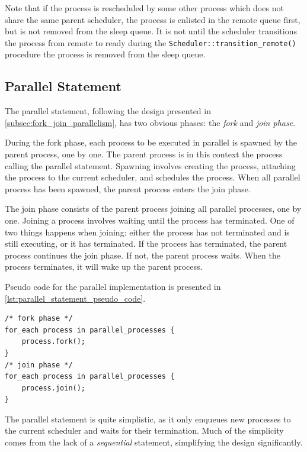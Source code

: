 Note that if the process is rescheduled by some other process which does not share the same parent scheduler, the process is enlisted in the remote queue first, but is not removed from the sleep queue. It is not until the scheduler transitions the process from remote to ready during the \texttt{Scheduler::transition\_remote()} procedure the process is removed from the sleep queue.


\subsection{Parallel Statement}


The parallel statement, following the design presented in \cref{subsec:fork_join_parallelism}, has two obvious phases: the \textit{fork} and \textit{join phase}. 

During the fork phase, each process to be executed in parallel is spawned by the parent process, one by one. The parent process is in this context the process calling the parallel statement. Spawning involves creating the process, attaching the process to the current scheduler, and schedules the process. When all parallel process has been spawned, the parent process enters the join phase.

The join phase consists of the parent process joining all parallel processes, one by one. Joining a process involves waiting until the process has terminated. One of two things happens when joining: either the process has not terminated and is still executing, or it has terminated. If the process has terminated, the parent process continues the join phase. If not, the parent process waits. When the process terminates, it will wake up the parent process.

Pseudo code for the parallel implementation is presented in \cref{lst:parallel_statement_pseudo_code}.

\begin{lstfloat}
\begin{lstlisting}[caption={Parallel statement pseudo code.}, label={lst:parallel_statement_pseudo_code}, style={CustomC++}, xleftmargin={2em}]
/* fork phase */
for_each process in parallel_processes {
    process.fork();
}
/* join phase */
for_each process in parallel_processes {
    process.join();
}
\end{lstlisting}
\end{lstfloat}

The parallel statement is quite simplistic, as it only enqueues new processes to the current scheduler and waits for their termination. Much of the simplicity comes from the lack of a \textit{sequential} statement, simplifying the design significantly. 


